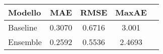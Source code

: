 \documentclass{standalone}
\begin{document}
\begin{tabular}{lcccc}
  \toprule
  Modello         &  MAE   &  RMSE  & MaxAE \\
  \midrule
  Baseline        & 0.3070 & 0.6716 & 3.001 \\
  Ensemble        & 0.2592 & 0.5536 & 2.4693 \\
  \bottomrule
\end{tabular}
\end{document}
